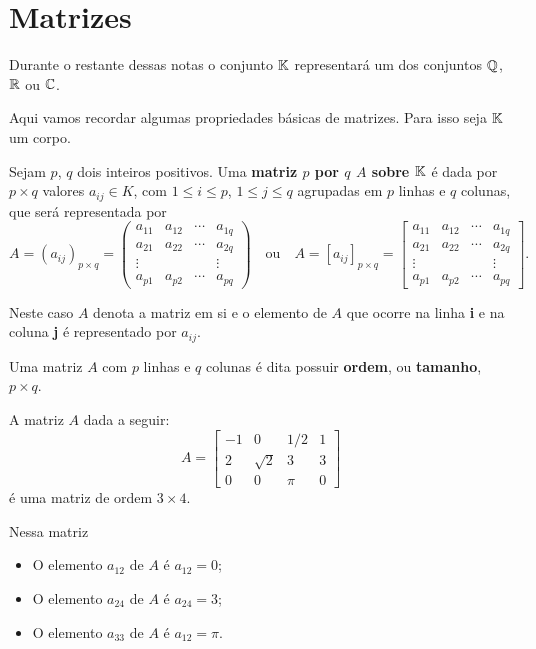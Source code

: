 \section{Matrizes}

Durante o restante dessas notas o conjunto $\mathbb{K}$ representará um dos conjuntos $\mathbb{Q}$, $\mathbb{R}$ ou $\mathbb{C}$.

Aqui vamos recordar algumas propriedades b\'asicas de matrizes. Para isso seja $\mathbb{K}$ um corpo.

Sejam $p$, $q$ dois inteiros positivos. Uma \textbf{matriz $p$ por $q$ $A$ sobre $\mathbb{K}$} \'e dada por $p \times q$ valores $a_{ij} \in K$, com $1 \le i \le p$, $1 \le j \le q$ agrupadas em $p$ linhas e $q$ colunas, que ser\'a representada por
\[
	A = (a_{ij})_{p\times q} = \begin{pmatrix}
		a_{11} & a_{12} & \cdots & a_{1q}\\
		a_{21} & a_{22} & \cdots & a_{2q}\\
		\vdots & & & \vdots\\
		a_{p1} & a_{p2} & \cdots & a_{pq}
	\end{pmatrix} \quad\mbox{ou}\quad
	A = [a_{ij}]_{p\times q} = \begin{bmatrix}
		a_{11} & a_{12} & \cdots & a_{1q}\\
		a_{21} & a_{22} & \cdots & a_{2q}\\
		\vdots & & & \vdots\\
		a_{p1} & a_{p2} & \cdots & a_{pq}
	\end{bmatrix}.
\]

Neste caso $A$ denota a matriz em si e o elemento de $A$ que ocorre na linha \textbf{i} e na coluna \textbf{j} é representado por $a_{ij}$.

Uma matriz $A$ com $p$ linhas e $q$ colunas é dita possuir \textbf{ordem}, ou \textbf{tamanho}, $p\times q$.

\begin{exemplo}
	A matriz $A$ dada a seguir:
	\[
		A = \begin{bmatrix}
			-1 & 0 & 1/2 & 1\\
			2 & \sqrt{2} & 3 & 3\\
			0 & 0 & \pi & 0
		\end{bmatrix}
	\]
	é uma matriz de ordem $3 \times 4$.

	Nessa matriz
	\begin{itemize}
		\item O elemento $a_{12}$ de $A$ é $a_{12} = 0$;

		\item O elemento $a_{24}$ de $A$ é $a_{24} = 3$;

		\item O elemento $a_{33}$ de $A$ é $a_{12} = \pi$.
	\end{itemize}
\end{exemplo}

